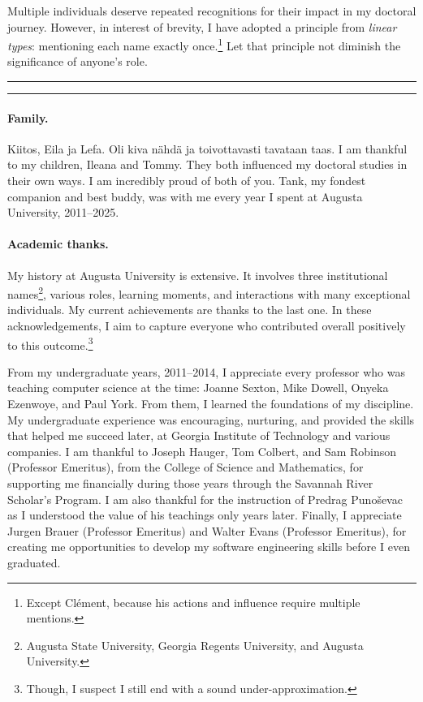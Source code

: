 Multiple individuals deserve repeated recognitions for their impact in my doctoral journey.
However, in interest of brevity, I have adopted a principle from \emph{linear types}: mentioning each name exactly once.\footnote{Except Clément, because his actions and influence require multiple mentions.}
Let that principle not diminish the significance of anyone's role. %

\noindent\hfil\rule{0.25\textwidth}{.4pt}\hspace{1em}\raisebox{-0.5\height}{\SixFlowerAltPetal}\hspace{1em}\rule{0.25\textwidth}{.4pt}\hfil

\paragraph*{Family.}
Kiitos, Eila ja Lefa.
Oli kiva nähdä ja toivottavasti tavataan taas.
I am thankful to my children, Ileana and Tommy.
They both influenced my doctoral studies in their own ways.
I am incredibly proud of both of you.
Tank, my fondest companion and best buddy, was with me every year I spent at Augusta University, 2011--2025.

\paragraph*{Academic thanks.}
My history at {Augusta University} is extensive.
It involves three institutional names\footnote{Augusta State University, Georgia Regents University, and Augusta University.},
various roles, learning moments, and interactions with many exceptional individuals.
My current achievements are thanks to the last one.
In these acknowledgements, I aim to capture everyone who contributed overall positively to this outcome.\footnote{Though, I suspect I still end with a sound under-approximation.}

From my undergraduate years, 2011--2014, I appreciate every professor who was teaching computer science at the time: Joanne Sexton, Mike Dowell, Onyeka Ezenwoye, and Paul York.
From them, I learned the foundations of my discipline.
My undergraduate experience was encouraging, nurturing, and provided the skills that helped me succeed later, at Georgia Institute of Technology and various companies.
I am thankful to Joseph Hauger, Tom Colbert, and Sam Robinson (Professor Emeritus), from the College of Science and Mathematics, for supporting me financially during those years through the Savannah River Scholar's Program.
I am also thankful for the instruction of Predrag Punoševac as I understood the value of his teachings only years later.
Finally, I appreciate Jurgen Brauer (Professor Emeritus) and Walter Evans (Professor Emeritus),
for creating me opportunities to develop my software engineering skills before I even graduated.

